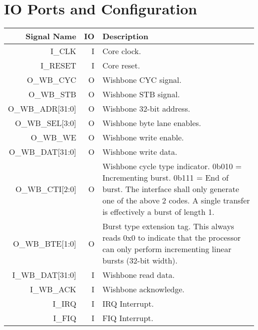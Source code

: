 \documentclass[10pt]{article}
\begin{document}
\section{IO Ports and Configuration}

\begin{tabularx} {\linewidth}{|r|r|X|}
\hline
Signal Name & IO & Description \\ \hline

I\_CLK &
I &
Core clock. \\ \hline

I\_RESET &
I &
Core reset. \\ \hline

O\_WB\_CYC &
O &
Wishbone CYC signal. \\ \hline

O\_WB\_STB &
O & 
Wishbone STB signal. \\ \hline

O\_WB\_ADR[31:0] &
O &
Wishbone 32-bit address. \\ \hline

O\_WB\_SEL[3:0] &
O &
Wishbone byte lane enables. \\ \hline

O\_WB\_WE &
O &
Wishbone write enable. \\ \hline

O\_WB\_DAT[31:0] &
O &
Wishbone write data. \\ \hline

O\_WB\_CTI[2:0] &
O &
Wishbone cycle type indicator. \newline
0b010 = Incrementing burst. \newline
0b111 = End of burst. \newline
The interface shall only generate one of the above 2 codes. 
A single transfer is effectively a burst of length 1.\\ \hline

O\_WB\_BTE[1:0] &
O &
Burst type extension tag. This always reads 0x0 to indicate that
the processor can only perform incrementing linear bursts (32-bit width). 
\\ \hline

I\_WB\_DAT[31:0] &
I &
Wishbone read data. \\ \hline

I\_WB\_ACK &
I &
Wishbone acknowledge. \\ \hline

I\_IRQ &
I  &
IRQ Interrupt. \\ \hline

I\_FIQ &
I &
FIQ Interrupt. \\ \hline
\end{tabularx}
\end{document}
